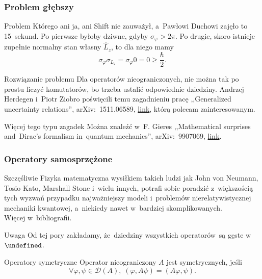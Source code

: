 \documentclass{beamer} \mode<presentation>
\newcommand{\fr}{\frac}
\newcommand{\wh}{\widehat}
\newcommand{\mc}{\mathcal}
\newcommand{\vp}{\varphi}
\newcommand{\si}{\sigma}
\newcommand{\D}{\mc{D}}
\let\H\undefined
\newcommand{\H}{\mc{H}}
\newcommand{\colorlink}[1]{\href{#1}{\color{orange} link}}
\newcommand{\DA}{\D( A )}
\begin{document}
\begin{frame}
  \frametitle{Problem głębszy}

  \begin{block}{Problem}
    Którego ani ja, ani Shift nie zauważył, a~Pawłowi Duchowi zajęło
    to 15~sekund. Po pierwsze byłoby dziwne, gdyby
    $\si_{ \vp } > 2 \pi$. Po drugie, skoro istnieje zupełnie normalny
    stan własny $\wh{ L }_{ z }$, to dla niego mamy
    \begin{equation}
      \label{eq:11}
      \si_{ \vp } \si_{ L_{ z } } = \si_{ \vp } 0 = 0 \geq \fr{ \hbar }{ 2 }.
    \end{equation}
  \end{block}

  \begin{block}{Rozwiązanie problemu}
    Dla operatorów nieograniczonych, nie można tak po prostu liczyć
    komutatorów, bo trzeba ustalić odpowiednie dziedziny. Andrzej
    Herdegen i~Piotr Ziobro poświęcili temu zagadnieniu pracę
    ,,Generalized uncertainty relations'', arXiv:~1511.06589,
    \colorlink{https://arxiv.org/abs/1511.06589}, którą polecam
    zainteresowanym.
  \end{block}

  \begin{block}{Więcej tego typu zagadek}
    Można znaleźć w~F. Gieres ,,Mathematical surprises and~Dirac's
    formalism in~quantum mechanics'', arXiv:~9907069,
    \colorlink{https://arxiv.org/abs/quant-ph/9907069}.
  \end{block}

\end{frame}



\begin{frame}
  \frametitle{Operatory samosprzężone}

  \begin{block}{Szczęśliwie}
    Fizyka matematyczna wysiłkiem takich ludzi jak John von Neumann,
    Tosio Kato, Marshall Stone i~wielu innych, potrafi sobie poradzić
    z~większością tych wyzwań przypadku najważniejszy modeli
    i~problemów nierelatywistycznej mechaniki kwantowej, a~niekiedy
    nawet w~bardziej skomplikowanych. \\
    Więcej w~bibliografii.
  \end{block}

  \begin{block}{Uwaga}
    Od tej pory zakładamy, że~dziedziny wszystkich operatorów~są gęste
    w~$\H$.
  \end{block}

  \begin{block}{Operatory symetryczne}
    Operator nieograniczony $A$ jest symetrycznych, jeśli
    \begin{equation}
      \label{eq:7}
      \forall \vp, \psi \in \DA, \; ( \vp, A\psi ) = ( A\vp, \psi ).
    \end{equation}
  \end{block}

\end{frame}
\end{document}

